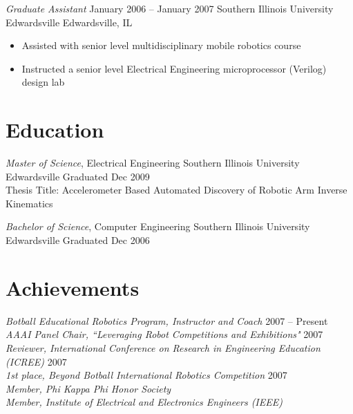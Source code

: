\documentclass[margin,line]{resume}
\begin{document}
\begin{resume}
{\sl Graduate Assistant} \hfill January 2006 -- January 2007
Southern Illinois University Edwardsville \hfill Edwardsville, IL
\begin{itemize} \itemsep -2pt %
    \small\item Assisted with senior level multidisciplinary mobile robotics course
    \small\item Instructed a senior level Electrical Engineering microprocessor (Verilog) design lab
\end{itemize}

\section{Education}

{\small
  {\sl Master of Science}, Electrical Engineering \hfill
  Southern Illinois University Edwardsville \hfill
  Graduated Dec 2009\\
  Thesis Title: Accelerometer Based Automated Discovery of Robotic Arm Inverse Kinematics
}

{\small
  {\sl Bachelor of Science}, Computer Engineering \hfill
  Southern Illinois University Edwardsville \hfill
  Graduated Dec 2006
}

\section{Achievements}

{\sl Botball Educational Robotics Program, Instructor and Coach} \hfill 2007 -- Present\\
{\sl AAAI Panel Chair, ``Leveraging Robot Competitions and Exhibitions"} \hfill 2007\\
{\sl Reviewer, International Conference on Research in Engineering Education (ICREE)} \hfill 2007\\
{\sl 1st place, Beyond Botball International Robotics Competition} \hfill 2007\\
{\sl Member, Phi Kappa Phi Honor Society}\\
{\sl Member, Institute of Electrical and Electronics Engineers (IEEE)}\\


\end{resume}
\end{document}
